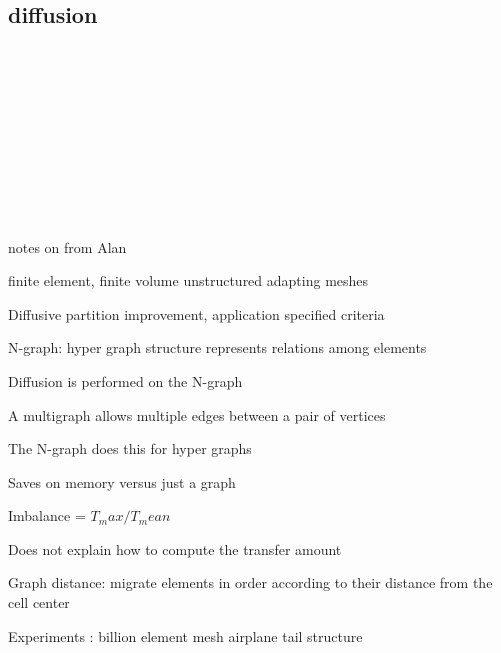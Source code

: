 \documentclass{article}
\begin{document}
\subsection{diffusion}

\let\clearpage\relax

\cite{Diamond:2017:DLB:3148226.3148236}\\
\cite{HORTON1993209}\\

\cite{Deng:2010:HDB:1889863.1889910}\\
\cite{Lieber:2016:PDL:2966884.2966887}\\

\cite{ROTARU2004481}\\
\cite{ParabolicLB}\\
\cite{CYBENKO1989279}\\
\cite{10.2307/2584287}\\
\cite{Boillat:1990:LBP:95324.95326}\\
\cite{XU199572}



\medskip
notes on \cite{Diamond:2017:DLB:3148226.3148236}
from Alan

finite element, finite volume unstructured adapting meshes

Diffusive partition improvement, application specified criteria

N-graph: hyper graph structure represents relations among elements

Diffusion is performed on the N-graph

A multigraph allows multiple edges between a pair of vertices

The N-graph does this for hyper graphs

Saves on memory versus just a graph

Imbalance = $T_max / T_mean$

Does not explain how to compute the transfer amount

Graph distance: migrate elements in order according to their distance from the cell center

Experiments : billion element mesh airplane tail structure
\end{document}
